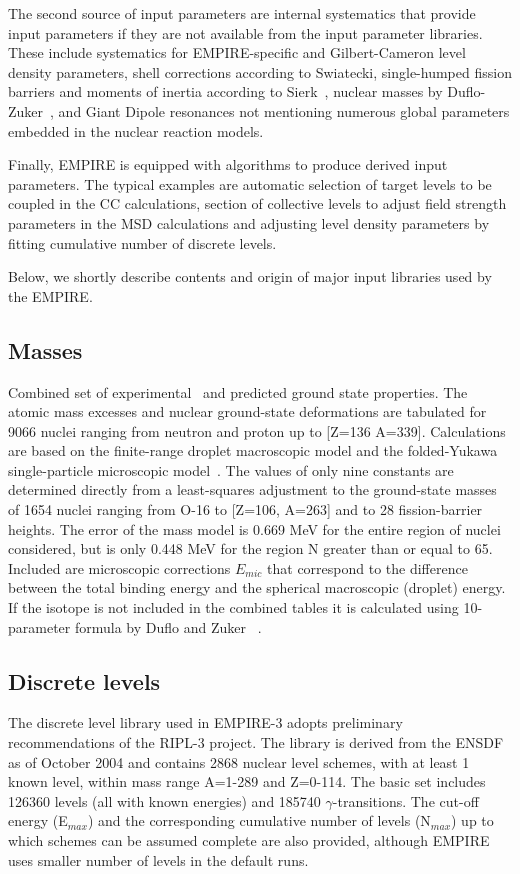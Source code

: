 \documentclass[twocolumn,amsmath,amssymb,10pt,groupedaddress,letter]{revtex4}
\begin{document}
The second source of input parameters are internal systematics that provide input parameters if they are not available from the input parameter libraries. These include systematics for EMPIRE-specific and Gilbert-Cameron level density parameters, shell corrections according to Swiatecki, single-humped fission barriers and moments of inertia according to Sierk~\cite{sierk}, nuclear masses by Duflo-Zuker~\cite{Duflo:96}, and Giant Dipole resonances not mentioning numerous global parameters embedded in the nuclear reaction models.

Finally, EMPIRE is equipped with algorithms to produce derived input parameters. The typical examples are automatic selection of target levels to be coupled in the CC calculations, section of collective levels to adjust field strength parameters in the MSD calculations and adjusting level density parameters by fitting cumulative number of discrete levels.

Below, we shortly describe contents and origin of major input libraries used by the EMPIRE.


\subsection{Masses}
Combined set of experimental~\cite{Audi} and predicted ground state
properties. The atomic mass excesses and nuclear ground-state deformations
are tabulated for 9066 nuclei ranging from neutron and proton up to
{[}Z=136 A=339{]}. Calculations are based on the finite-range droplet
macroscopic model and the folded-Yukawa single-particle microscopic
model~\cite{Moller95}. The values of only nine constants are determined
directly from a least-squares adjustment to the ground-state masses
of 1654 nuclei ranging from O-16 to {[}Z=106, A=263{]} and to 28 fission-barrier
heights. The error of the mass model is 0.669 MeV for the entire region
of nuclei considered, but is only 0.448 MeV for the region N greater
than or equal to 65. Included are microscopic corrections $E_{mic}$
that correspond to the difference between the total binding energy
and the spherical macroscopic (droplet) energy. If the isotope is not included
in the combined tables it is calculated using 10-parameter formula by Duflo and Zuker ~\cite{Duflo:96}.

\subsection{Discrete levels}

The discrete level library used in EMPIRE-3 adopts
preliminary recommendations of the RIPL-3 project. The library is derived
from the ENSDF as of October 2004 and contains 2868 nuclear level schemes, with at least
1 known level, within mass range A=1-289 and Z=0-114. The basic set
includes 126360 levels (all with known energies) and 185740 $\gamma$-transitions.
The cut-off energy (E$_{{max}}$) and the corresponding
cumulative number of levels (N$_{{max}}$) up to which schemes can
be assumed complete are also provided, although EMPIRE uses
smaller number of levels in the default runs.
\end{document}
